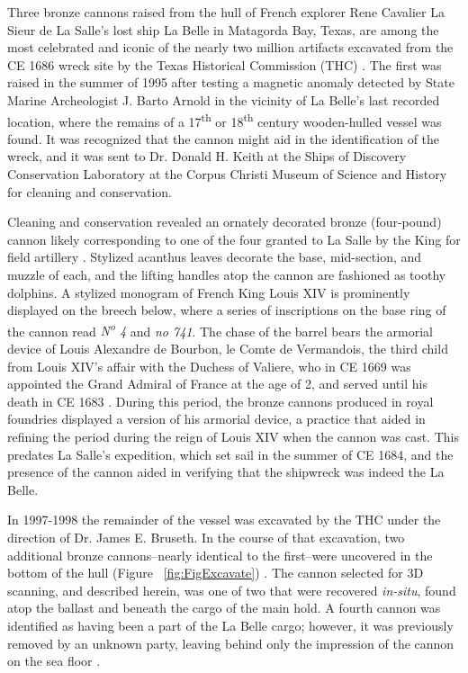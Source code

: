 \documentclass[review]{elsarticle}
\begin{document}
Three bronze cannons raised from the hull of French explorer Rene Cavalier La Sieur de La Salle's lost ship La Belle in Matagorda Bay, Texas, are among the most celebrated and iconic of the nearly two million artifacts excavated from the CE 1686 wreck site by the Texas Historical Commission (THC) \citep{RN5767}. The first was raised in the summer of 1995 after testing a magnetic anomaly detected by State Marine Archeologist J. Barto Arnold in the vicinity of La Belle's last recorded location, where the remains of a 17\textsuperscript{th} or 18\textsuperscript{th} century wooden-hulled vessel \citep{RN5766,RN5765} was found. It was recognized that the cannon might aid in the identification of the wreck, and it was sent to Dr. Donald H. Keith at the Ships of Discovery Conservation Laboratory at the Corpus Christi Museum of Science and History for cleaning and conservation.

Cleaning and conservation revealed an ornately decorated bronze (four-pound) cannon likely corresponding to one of the four granted to La Salle by the King for field artillery \citep{RN5763,RN5764}. Stylized acanthus leaves decorate the base, mid-section, and muzzle of each, and the lifting handles atop the cannon are fashioned as toothy dolphins. A stylized monogram of French King Louis XIV is prominently displayed on the breech below, where a series of inscriptions on the base ring of the cannon read \textit{N\textsuperscript{o} 4} and \textit{no  741}. The chase of the barrel bears the armorial device of Louis Alexandre de Bourbon, le Comte de Vermandois, the third child from Louis XIV's affair with the Duchess of Valiere, who in CE 1669 was appointed the Grand Admiral of France at the age of 2, and served until his death in CE 1683 \citep[354]{RN5763}. During this period, the bronze cannons produced in royal foundries displayed a version of his armorial device, a practice that aided in refining the period during the reign of Louis XIV when the cannon was cast. This predates La Salle's expedition, which set sail in the summer of CE 1684, and the presence of the cannon aided in verifying that the shipwreck was indeed the La Belle.

In 1997-1998 the remainder of the vessel was excavated by the THC under the direction of Dr. James E. Bruseth. In the course of that excavation, two additional bronze cannons--nearly identical to the first--were uncovered in the bottom of the hull (Figure ~\ref{fig:FigExcavate}) \citep{RN5763,RN5762,RN5761}. The cannon selected for 3D scanning, and described herein, was one of two that were recovered \textit{in-situ}, found atop the ballast and beneath the cargo of the main hold. A fourth cannon was identified as having been a part of the La Belle cargo; however, it was previously removed by an unknown party, leaving behind only the impression of the cannon on the sea floor \citep{RN5763}. 
\end{document}
